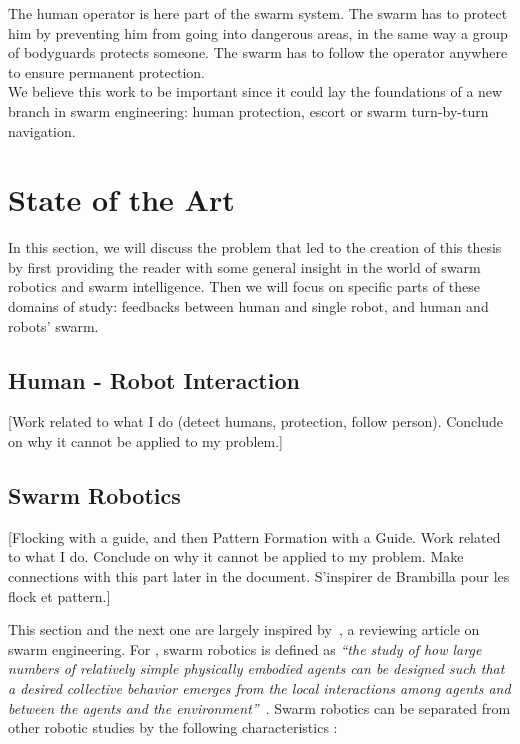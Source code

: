 \documentclass[oneside, a4paper, 12pt]{memoir}
\newcommand{\quot}[1]{\textit{\enquote{#1}}}
\begin{document}
	The human operator is here part of the swarm system. The swarm has to protect him by preventing him from going into dangerous areas, in the same way a group of bodyguards protects someone. The swarm has to follow the operator anywhere to ensure permanent protection.\\
	
	We believe this work to be important since it could lay the foundations of a new branch in swarm engineering: human protection, escort or swarm turn-by-turn navigation.

\chapter{State of the Art}
	
	In this section, we will discuss the problem that led to the creation of this thesis by first providing the reader with some general insight in the world of swarm robotics and swarm intelligence. Then we will focus on specific parts of these domains of study: feedbacks between human and single robot, and human and robots' swarm.
	
	\section{Human - Robot Interaction}
	
	[Work related to what I do (detect humans, protection, follow person). Conclude on why it cannot be applied to my problem.]

	\section{Swarm Robotics}
	
	[Flocking with a guide, and then Pattern Formation with a Guide. Work related to what I do. Conclude on why it cannot be applied to my problem. Make connections with this part later in the document. S'inspirer de Brambilla pour les flock et pattern.]
	
	This section and the next one are largely inspired by~\citet{brambilla2013swarm}, a reviewing article on swarm engineering. For \citet{csahin2005swarm}, swarm robotics is defined as \quot{the study of how large numbers of relatively simple physically embodied agents can be designed such that a desired collective behavior emerges from the local interactions among agents and between the agents and the environment}~\citep{csahin2005swarm}. Swarm robotics can be separated from other robotic studies by the following characteristics \citep{brambilla2013swarm}:
	
\end{document}
